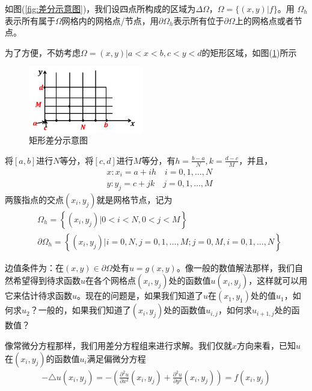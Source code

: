             如图(\ref{fig:差分示意图})，我们设四点所构成的区域为$\Delta \Omega$，$\Omega = \{(x,y)|f\}$。用
            $\Omega_h$表示所有属于$\Omega$网格内的网格点/节点，用$\partial\Omega_h$表示所有位于$\partial\Omega$上的网格点或者节点。
            \par
            为了方便，不妨考虑$\Omega = {(x,y)|a<x<b,c<y<d}$的矩形区域，如图(\ref{fig:矩形差分示意图})所示
		\begin{figure}[H]
		\centering
		\includegraphics[width=5cm]{images/Rectangular_difference.jpg}
		\caption{矩形差分示意图}
		\label{fig:矩形差分示意图}
		\end{figure}
            将$[a,b]$进行$N$等分，将$[c,d]$进行$M$等分，有$h = \frac{b-a}{N},k = \frac{d-c}{M}$，并且，
            \begin{align*}
                &x:x_i = a + ih\quad i = 0,1,\dots, N\\
                &y:y_j = c + jk\quad j = 0,1,\dots, M
            \end{align*}
            两簇指点的交点$(x_i,y_j)$就是网格节点，记为
            \begin{align*}
                &\Omega_h = \left \{ (x_i,y_j)| 0<i<N,0<j<M \right\} \\
                &\partial \Omega_h = \left \{ (x_i,y_j)| i = 0, N,j = 0,1,\dots,M;j = 0,M,i = 0,1,\dots,N \right\}
            \end{align*}
            \par
            边值条件为：在$(x,y) \in \partial \Omega$处有$u = g(x,y)$。像一般的数值解法那样，我们自然希望得到待求函数$u$在各个网格点$(x_i,y_j)$处的函数值$u(x_i,y_j)$，这样就可以用它来估计待求函数$u$。现在的问题是，如果我们知道了$u$在$(x_1,y_1)$处的值$u_1$，如何求$u_2$？一般的，如果我们知道了$(x_i,y_j)$处的函数值$u_{i,j}$，如何求$u_{i+1,j}$处的函数值？
            \par
            像常微分方程那样，我们用差分方程组来进行求解。我们仅就$x$方向来看，已知$u$在$(x_i,y_j)$的函数值$u_i$满足偏微分方程
            \begin{align}
            \label{点的偏微分方程}
                -\triangle u (x_i,y_j) =-\left( \frac{\partial^2 u}{\partial x^2}(x_i,y_j) + \frac{\partial^2 u}{\partial y^2} (x_i,y_j)\right) = f(x_i,y_j)
            \end{align}
